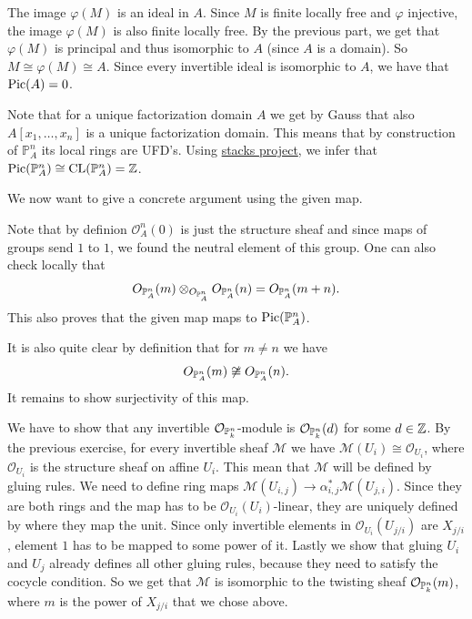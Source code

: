 \begin{exercise}{1}
\begin{enumerate}
{                The image $\varphi(M)$ is an ideal in $A$.
                Since $M$ is finite locally free and $\varphi$ injective, the
                image $\varphi(M)$ is also finite locally free. By the previous
                part, we get that $\varphi(M)$ is principal and thus isomorphic to $A$
                (since $A$ is a domain).
                So $M \cong \varphi(M) \cong A$.
                Since every invertible ideal is isomorphic to $A$, we have that
                $\operatorname{Pic}(A) = 0$.
            }
    \end{enumerate}
\end{exercise}

\begin{exercise}{2}
    Note that for a unique factorization domain $A$ we get by Gauss that also
    $A[x_1,\dots, x_n]$ is a unique factorization domain. This means that by
    construction of $\mathbb{P}_A^n$ its local rings are UFD's. Using
    \href{https://stacks.math.columbia.edu/tag/0BE9}{stacks project}, we infer
    that $\operatorname{Pic}(\mathbb{P}_A^n)\cong \operatorname{CL}(\mathbb{P}_A^n)=\mathbb{Z}$.

    We now want to give a concrete argument using the given map.

    Note that by definion $\mathcal{O}^n_A(0)$ is just the structure sheaf and
    since maps of groups send $1$ to $1$, we found the neutral element of this
    group. One can also check locally that 
    \begin{align*}
       O_{\mathbb{P}^n_A}(m)\otimes_{O_{\mathbb{P}^n_A}} O_{\mathbb{P}^n_A}(n) = O_{\mathbb{P}^n_A}(m+n).
    \end{align*}
    This also proves that the given map maps to $\operatorname{Pic}(\mathbb{P}^n_A)$.

    It is also quite clear by definition that for $m\not=n$ we have
    \begin{align}
        O_{\mathbb{P}^n_A}(m)\not \cong O_{\mathbb{P}^n_A}(n).
    \end{align}
    It remains to show surjectivity of this map.

    We have to show that any invertible $\mathcal{O}_{\mathbb{P}^n_k}$-module is
    $\mathcal{O}_{\mathbb{P}^n_k}(d)$ for some $d \in \mathbb{Z}$.
    By the previous exercise, for every invertible sheaf $\mathcal{M}$ we have
    $\mathcal{M}(U_i) \cong \mathcal{O}_{U_i}$, where $\mathcal{O}_{U_i}$ is the
    structure sheaf on affine $U_i$.
    This mean that $\mathcal{M}$ will be defined by gluing rules.
    We need to define ring maps $\mathcal{M}(U_{i, j}) \to \alpha^*_{i, j}
    \mathcal{M}(U_{j, i})$. Since they are both rings and the map has to be
    $\mathcal{O}_{U_i}(U_i)$-linear, they are uniquely defined by where they map
    the unit. Since only invertible elements in $\mathcal{O}_{U_i}(U_{j/i})$ are
    $X_{j/i}$, element $1$ has to be mapped to some power of it. 
    Lastly we show that gluing $U_i$ and $U_j$ already defines all other gluing
    rules, because they need to satisfy the cocycle condition. So we get that
    $\mathcal{M}$ is isomorphic to the twisting sheaf
    $\mathcal{O}_{\mathbb{P}^n_k}(m)$, where $m$ is the power of $X_{j/i}$ that we
    chose above.
\end{exercise}

